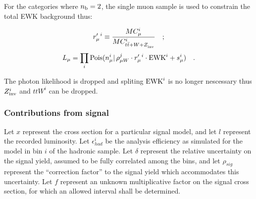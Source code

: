 %
\newcommand{\rpi}{\ensuremath{r_{\mu}^{\prime\ i}}\xspace}

For the categories where $n_{\text{b}}=2$, the single muon sample is used to constrain the
total EWK background thus:

\begin{equation}
\rpi \equiv \frac{MC_{\mu}^i}{MC_{t\bar{t}+W+\zInv{}}^i}\quad ;
\end{equation}
\begin{equation}
\label{eq:muonLikelihoodTotalEwk}
L_{\mu}=\prod_i \mathrm{Pois}(n_{\mu}^i |\, \rho_{\mu W}^j \cdot
\rpi \cdot \ewk^{i} + s_{\mu}^i)\quad .
\end{equation}

The photon likelihood is dropped and spliting $\mathrm{EWK}^i$ is no longer
nescessary thus $Z_{\rm inv}^{i}$ and $ttW^{i}$ can be dropped. 

\subsubsection{Contributions from signal}
\label{sec:signalContrib}

Let $x$ represent the cross section for a particular signal model, and
let $l$ represent the recorded luminosity.  Let $\epsilon^{i}_{had}$ 
be the analysis efficiency as simulated for the model in \HT bin $i$ 
of the hadronic sample.  Let $\delta$ represent the relative uncertainty on
the signal yield, assumed to be fully correlated among the bins, and
let $\rho_{sig}$ represent the ``correction factor'' to the signal
yield which accommodates this uncertainty.  Let $f$ represent an
unknown multiplicative factor on the signal cross section, for which
an allowed interval shall be determined.

